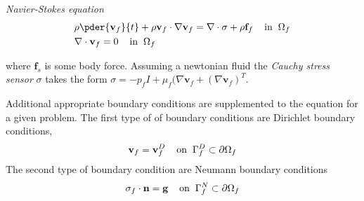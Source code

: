 \begin{equat}
\textit{Navier-Stokes equation}
\begin{align}
&\rho \pder{\mathbf{v}_f}{t} + \rho \mathbf{v}_f \cdot \nabla \mathbf{v}_f =
\nabla \cdot \sigma + \rho \mathbf{f}_f \hspace{4mm} \text{in} \hspace{2mm} \Omega_f \\
&\nabla \cdot \mathbf{v}_f = 0 \hspace{4mm} \text{in} \hspace{2mm} \Omega_f 
\end{align} 
\end{equat}
where $\mathbf{f}_s$ is some body force. 
Assuming a newtonian fluid the \textit{Cauchy stress sensor} $\sigma$ takes the form \newline $\sigma = -p_f I + \mu_f (\nabla \mathbf{v}_f + (\nabla \mathbf{v}_f)^T$.

Additional appropriate boundary conditions are supplemented to the equation for a given problem. The first type of of boundary conditions are Dirichlet boundary conditions, 
\begin{align}
\mathbf{v}_f = \mathbf{v}_f^D 
\hspace{4mm} \text{on} \hspace{2mm} \Gamma_f^D \subset \partial \Omega_f 
\end{align}
The second type of boundary condition are Neumann boundary conditions
\begin{align}
\sigma_f \cdot \mathbf{n} = \mathbf{g} 
\hspace{4mm} \text{on} \hspace{2mm} \Gamma_f^N \subset \partial \Omega_f 
\end{align}

\newpage
